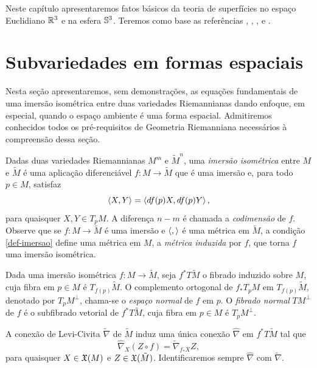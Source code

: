 Neste capítulo apresentaremos fatos básicos da teoria de superfícies no espaço Euclidiano $\mathbb{R}^3$ e na esfera $\mathbb{S}^3$. Teremos como base as referências \cite{Carmo1987}, \cite{Meeks2012}, \cite{Nitsche2011}, \cite{Brendle2013} e \cite{Dajczer2019}.

\section{Subvariedades em formas espaciais}

Nesta seção apresentaremos, sem demonstrações, as equações fundamentais de uma imersão isométrica entre duas variedades Riemannianas dando enfoque, em especial, quando o espaço ambiente é uma forma espacial. Admitiremos conhecidos todos os pré-requisitos de Geometria Riemanniana necessários à compreensão dessa seção.

Dadas duas variedades Riemannianas $M^m$ e $\tilde{M}^n$, uma \emph{imersão isométrica} entre $M$ e $\tilde{M}$ é uma aplicação diferenciável $f: M \rightarrow \tilde{M}$ que é uma imersão e, para todo $p \in M$, satisfaz
\begin{equation}\label{def-imersao}
\left\langle X,Y \right\rangle = \left\langle df(p) X,df(p) Y \right\rangle,	
\end{equation}
para quaisquer $X,Y \in T_p M$. A diferença $n-m$ é chamada a \emph{codimensão} de $f$. Observe que se $f: M \rightarrow \tilde{M}$ é uma imersão e $\left\langle , \right\rangle$ é uma métrica em $\tilde{M}$, a condição \eqref{def-imersao} define uma métrica em $M$, a \emph{métrica induzida} por $f$, que torna $f$ uma imersão isométrica.

\begin{definicao}
	Dada uma imersão isométrica $f: M \rightarrow \tilde{M}$, seja $f^* T \tilde{M}$ o fibrado induzido sobre $M$, cuja fibra em $p \in M$ é $T_{f(p)} \tilde{M}$. O complemento ortogonal de $f_* T_p M$ em $T_{f(p)} \tilde{M}$, denotado por $T_p M^\perp$, chama-se o \emph{espaço normal} de $f$ em $p$. O \emph{fibrado normal} $TM^\perp$ de $f$ é o subfibrado vetorial de $f^* T \tilde{M}$, cuja fibra em $p \in M$ é $T_p M^\perp$.
\end{definicao}

A conexão de Levi-Civita $\tilde{\nabla}$ de $\tilde{M}$ induz uma única conexão $\hat{\nabla}$ em $f^* T \tilde{M}$ tal que
\[ \hat{\nabla}_X (Z \circ f) = \tilde{\nabla}_{f_* X} Z, \]
para quaisquer $X \in \mathfrak{X}(M)$ e $Z \in \mathfrak{X}(\tilde{M})$. Identificaremos sempre $\hat{\nabla}$ com $\tilde{\nabla}$.

